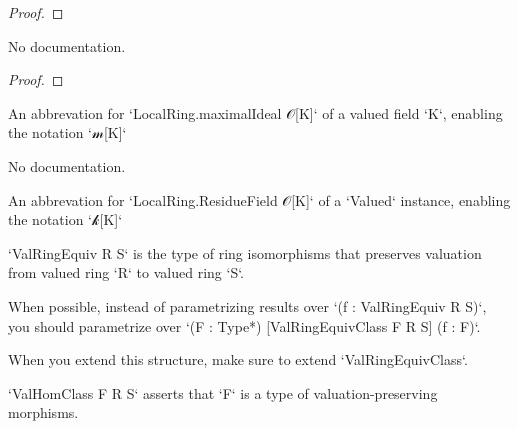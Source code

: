 \begin{proof}
    \leanok
\end{proof}

\begin{theorem}\label{Valued.integer_val_le_one}
        \leanok
                No documentation.
    \end{theorem}

\begin{proof}
    \leanok
\end{proof}

\begin{definition}\label{Valued.maximalIdeal}
        \leanok
                An abbrevation for `LocalRing.maximalIdeal 𝒪[K]` of a valued field `K`, enabling the notation `𝓂[K]`
    \end{definition}

\begin{theorem}\label{Valued.maximalIdeal_eq}
                No documentation.
    \end{theorem}

\begin{definition}\label{Valued.ResidueField}
        \leanok
                An abbrevation for `LocalRing.ResidueField 𝒪[K]` of a `Valued` instance, enabling the notation `𝓀[K]`
    \end{definition}

\begin{definition}\label{ValRingEquiv}
        \leanok
                `ValRingEquiv R S` is the type of ring isomorphisms that preserves valuation from valued ring `R` to valued ring `S`.

When possible, instead of parametrizing results over `(f : ValRingEquiv R S)`,
you should parametrize over `(F : Type*) [ValRingEquivClass F R S] (f : F)`.

When you extend this structure, make sure to extend `ValRingEquivClass`.
    \end{definition}

\begin{definition}\label{ValRingHomClass}
        \leanok
                `ValHomClass F R S` asserts that `F` is a type of valuation-preserving morphisms.
    \end{definition}

